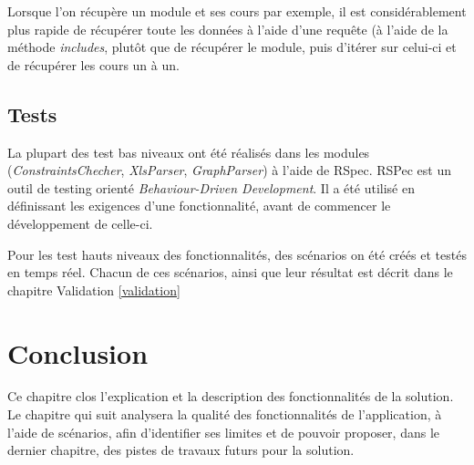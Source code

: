 Lorsque l'on récupère un module et ses cours par exemple, il est considérablement plus rapide de récupérer toute les données à l'aide d'une requête (à l'aide de la méthode \textit{includes}, plutôt que de récupérer le module, puis d'itérer sur celui-ci et de récupérer les cours un à un. 


\subsection{Tests}
La plupart des test bas niveaux ont été réalisés dans les modules (\textit{ConstraintsChecher}, \textit{XlsParser}, \textit{GraphParser}) à l'aide de RSpec. RSPec est un outil de testing orienté \textit{Behaviour-Driven Development}. Il a été utilisé en définissant les exigences d'une fonctionnalité, avant de commencer le développement de celle-ci.

Pour les test hauts niveaux des fonctionnalités, des scénarios on été créés et testés en temps réel. Chacun de ces scénarios, ainsi que leur résultat est décrit dans le chapitre Validation \ref{validation}
\section{Conclusion}

Ce chapitre clos l'explication et la description des fonctionnalités de la solution. Le chapitre qui suit analysera la qualité des fonctionnalités de l'application, à l'aide de scénarios, afin d'identifier ses limites et de pouvoir proposer, dans le dernier chapitre, des pistes de travaux futurs pour la solution. 
